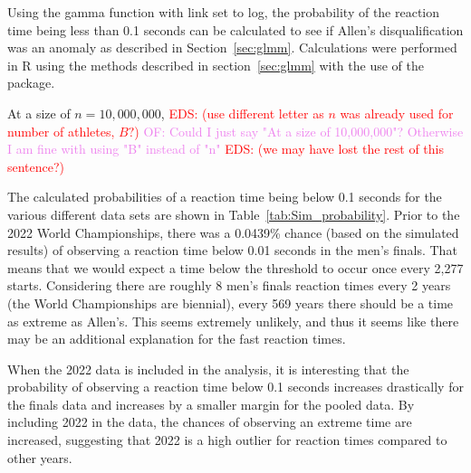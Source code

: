 \documentclass[12pt, letterpaper, titlepage]{article}
\newcommand{\eds}[1]{\textcolor{red}{EDS: (#1)}}
\newcommand{\of}[1]{\textcolor{violet}{OF: #1}}
\begin{document}

Using the gamma function with link set to log, the probability of the reaction 
time being less than 0.1 seconds can be calculated to see if Allen's 
disqualification was an anomaly as described in Section~\ref{sec:glmm}.
Calculations were performed in R using the methods described in 
section~\ref{sec:glmm} with the use of the \citet{lme4} package.


At a size of $n=10,000,000$, \eds{use different letter as $n$ was already used 
for number of athletes, $B?$} \of{Could I just say "At a size of 10,000,000"? 
Otherwise I am fine with using "B" instead of "n"} \eds{we may have lost the 
rest of this sentence?}


The calculated probabilities of a reaction time 
being below 0.1 seconds for the various different data sets are shown in 
Table~\ref{tab:Sim_probability}. Prior to the 2022 World Championships, there 
was a 0.0439\% chance (based on the
simulated results) of observing a reaction time below 0.01 seconds in the men's
finals.
That means that we would expect a time below the threshold to occur
once every 2,277 starts.  Considering there are roughly 8 men's finals reaction
times every 2 years (the World Championships are biennial), every 569 years there
should be a time as extreme as Allen's. This seems extremely unlikely, and thus
it seems like there may be an additional explanation for the fast reaction times.


When the 2022 data is included in the analysis, it is interesting that the 
probability of observing a reaction time below 0.1 seconds increases drastically 
for the finals data and increases by a smaller margin for the pooled data.  By
including 2022 in the data, the chances of observing an extreme time are 
increased, suggesting that 2022 is a high outlier for reaction times compared to
 other years.
\end{document}
